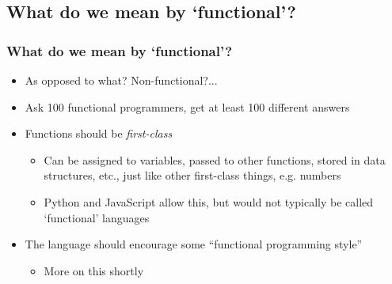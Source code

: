 \documentclass{beamer}
\begin{document}
  \subsection{What do we mean by `functional'?}
  \begin{frame}
    \frametitle{What do we mean by `functional'?}
    \begin{itemize}
      \item As opposed to what? Non-functional?...
      \item Ask 100 functional programmers, get at least 100 different answers
      \item Functions should be \textit{first-class}
        \begin{itemize}
          \item Can be assigned to variables, passed to other functions, stored
                in data structures, etc., just like other first-class things,
                e.g. numbers
          \item Python and JavaScript allow this, but would not typically be
                called `functional' languages
        \end{itemize}
      \item The language should encourage some ``functional programming style''
        \begin{itemize}
          \item More on this shortly
        \end{itemize}
    \end{itemize}
  \end{frame}
\end{document}
